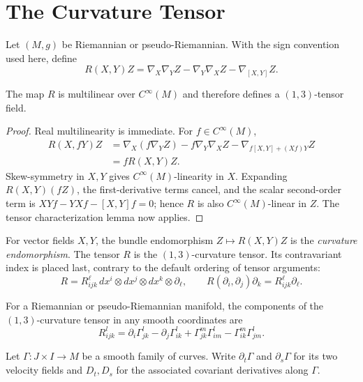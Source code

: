 \section{The Curvature Tensor}

Let $(M,g)$ be Riemannian or pseudo-Riemannian. With the sign convention used
here, define
\[
R(X,Y)Z
=\nabla_X\nabla_YZ-\nabla_Y\nabla_XZ-\nabla_{[X,Y]}Z.
\]

\begin{proposition}
\label{prop:curvature-multilinearity}

The map $R$ is multilinear over $C^\infty(M)$ and therefore defines a
$(1,3)$-tensor field.
\end{proposition}

\begin{proof}
\sketch Real multilinearity is immediate. For $f\in C^\infty(M)$,
\begin{align*}
R(X,fY)Z
&=\nabla_X(f\nabla_YZ)-f\nabla_Y\nabla_XZ
  -\nabla_{f[X,Y]+(Xf)Y}Z\\
&=fR(X,Y)Z.
\end{align*}
Skew-symmetry in $X,Y$ gives $C^\infty(M)$-linearity in $X$. Expanding
$R(X,Y)(fZ)$, the first-derivative terms cancel, and the scalar second-order
term is
$XYf-YXf-[X,Y]f=0$; hence $R$ is also $C^\infty(M)$-linear in $Z$.
The tensor characterization lemma now applies.
\end{proof}

For vector fields $X,Y$, the bundle endomorphism $Z\mapsto R(X,Y)Z$ is the
\emph{curvature endomorphism}. The tensor $R$ is the $(1,3)$-curvature tensor.
Its contravariant index is placed last, contrary to the default ordering of
tensor arguments:
\[
R=R_{ijk}^{\ell}\,dx^i\otimes dx^j\otimes dx^k\otimes\partial_\ell,
\qquad
R(\partial_i,\partial_j)\partial_k=R_{ijk}^{\ell}\partial_\ell.
\]

\begin{proposition}
\label{prop:curvature-tensor-components}
For a Riemannian or pseudo-Riemannian manifold, the components of the
$(1,3)$-curvature tensor in any smooth coordinates are
\begin{equation}
R_{ijk}^l
=\partial_i\Gamma_{jk}^l-\partial_j\Gamma_{ik}^l
+\Gamma_{jk}^m\Gamma_{im}^l-\Gamma_{ik}^m\Gamma_{jm}^l. \tag{7.4}
\end{equation}
\end{proposition}

Let $\Gamma\colon J\times I\to M$ be a smooth family of curves. Write
$\partial_t\Gamma$ and $\partial_s\Gamma$ for its two velocity fields and
$D_t,D_s$ for the associated covariant derivatives along $\Gamma$.

